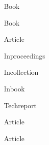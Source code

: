 \documentclass[12pt, a4paper]{article}
\begin{document}
Book            \cite{press001} \par
Book            \cite{agrawal001}\par
Article         \cite{xuemingliu001}\par
Inproceedings   \cite{woodbury001}\par
Incollection    \cite{agrawal004}\par
Inbook          \cite{mollenauer001}\par
Techreport      \cite{itu.g694.2}\par
Article         \cite{smekal001}\par
Article         \cite{dipascuale001}\par
    
    
\end{document}
